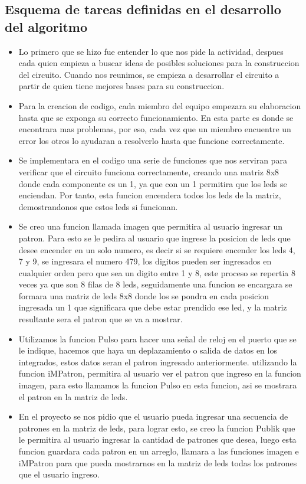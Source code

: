 \documentclass{article}
\begin{document}
\subsection{Esquema de tareas definidas en el desarrollo del algoritmo}

\begin{itemize}
    \item Lo primero que se hizo fue entender lo que nos pide la actividad, despues cada quien empieza a buscar ideas de posibles soluciones para la construccion del circuito. Cuando nos reunimos, se empieza a desarrollar el circuito a partir de quien tiene mejores bases para su construccion.
    \item Para la creacion de codigo, cada miembro del equipo empezara su elaboracion hasta que se exponga su correcto funcionamiento.
    En esta parte es donde se encontrara mas problemas, por eso, cada vez que un miembro encuentre un error los otros lo ayudaran a resolverlo hasta que funcione correctamente.
    \item Se implementara en el codigo una serie de funciones que nos serviran para verificar que el circuito funciona correctamente, creando una matriz 8x8 donde cada componente es un 1, ya que con un 1 permitira que los leds se enciendan. Por tanto, esta funcion encendera todos los leds de la matriz, demostrandonos que estos leds si funcionan.
    \item Se creo una funcion llamada imagen que permitira al usuario ingresar un patron. Para esto se le pedira al usuario que ingrese la posicion de leds que desee encender en un solo numero, es decir si se requiere encender los leds 4, 7 y 9, se ingresara el numero 479, los digitos pueden ser ingresados en cualquier orden pero que sea un digito entre 1 y 8, este proceso se repertia 8 veces ya que son 8 filas de 8 leds, seguidamente una funcion se encargara se formara una matriz de leds 8x8 donde los se pondra en cada posicion ingresada un 1 que significara que debe estar prendido ese led, y la matriz resultante sera el patron que se va a mostrar.
    \item Utilizamos la funcion Pulso para hacer una señal de reloj en el puerto que se le indique, hacemos que  haya un deplazamiento o salida de datos en los integrados, estos datos seran el patron ingresado anteriormente. utilizando la funcion iMPatron, permitira al usuario ver el patron que ingreso en la funcion imagen, para esto llamamos la funcion Pulso en esta funcion, asi se mostrara el patron en la matriz de leds.
    \item En el proyecto se nos pidio que el usuario pueda ingresar una secuencia de patrones en la matriz de leds, para lograr esto, se creo la funcion Publik que le permitira al usuario ingresar la cantidad de patrones que desea, luego esta funcion guardara cada patron en un arreglo, llamara a las funciones imagen e iMPatron para que pueda mostrarnos en la matriz de leds todas los patrones que el usuario ingreso.

\end{itemize}
\end{document}
